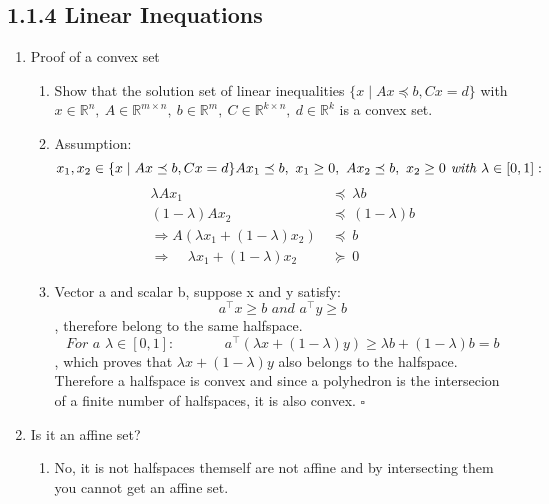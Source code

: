 \documentclass{report}
\begin{document}
	\subsection*{1.1.4 Linear Inequations}
	\begin{enumerate}[1.]
		\item Proof of a convex set
		\begin{enumerate}[]
			\item Show that the solution set of linear inequalities $\{x \mid Ax \preceq b, Cx = d\}$ with $x\in \mathbb{R}^n, \ A \in \mathbb{R}^{m \times n}, \ b \in \mathbb{R}^m, \ C \in \mathbb{R}^{k\times n }, \ d \in \mathbb{R}^k$ is a convex set.
			\item Assumption:
			\[
				x_1, x_2 \in \{x \mid Ax \preceq b, Cx =d\} $$ $$
				Ax_1 \preceq b, \ x_1 \geq 0, \ Ax_2 \preceq b, \ x_2 \geq 0 \textit{ with } \lambda \in [0,1]:
			\]
			\begin{align*}
				\lambda Ax_1 \ & \preceq \ \lambda b \\
				(1-\lambda)Ax_2 \ & \preceq \ (1-\lambda) b \\
				\Rightarrow A(\lambda x_1 + (1-\lambda ) x_2) \ & \preceq \ b \\
				\Rightarrow \ \ \ \ \ \lambda x_1 + (1-\lambda ) x_2 \ & \succeq \ 0
			\end{align*}
			\item Vector a and scalar b, suppose x and y satisfy:
			\[
				a^{\top}x \geq b \textit{ and } a^{\top}y \geq b
			\]
			, therefore belong to the same halfspace.
			\[
				\textit{For a }\lambda \in [0,1]: \ \ \ \ \ \ \ \ \ \ \ \ \ \ \ \ a^{\top}(\lambda x + (1-\lambda ) y) \geq \lambda b + (1-\lambda ) b = b
			\]
			, which proves that $\lambda x + (1-\lambda ) y$ also belongs to the halfspace. \\
			Therefore a halfspace is convex and since a polyhedron is the intersecion of a finite number of halfspaces, it is also convex. $\square$
		\end{enumerate}
		\item Is it an affine set?
		\begin{enumerate}[]
			\item No, it is not halfspaces themself are not affine and by intersecting them you cannot get an affine set.
		\end{enumerate}
	\end{enumerate}
	
\end{document}
